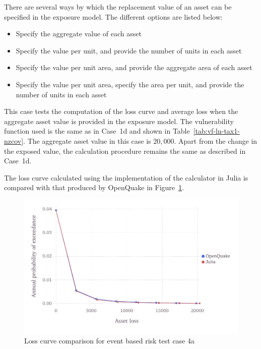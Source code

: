 There are several ways by which the replacement value of an asset can be specified in the exposure model. The different options are listed below:

\begin{itemize}
	\item Specify the aggregate value of each asset
	\item Specify the value per unit, and provide the number of units in each asset
	\item Specify the value per unit area, and provide the aggregate area of each asset
	\item Specify the value per unit area, specify the area per unit, and provide the number of units in each asset
\end{itemize}

This case tests the computation of the loss curve and average loss when the aggregate asset value is provided in the exposure model. The vulnerability function used is the same as in Case~1d and shown in Table~\ref{tab:vf-ln-tax1-nzcov}. The aggregate asset value in this case is $20,000$. Apart from the change in the exposed value, the calculation procedure remains the same as described in Case~1d.

The loss curve calculated using the implementation of the calculator in Julia is compared with that produced by OpenQuake in Figure~\ref{fig:lc-ebr-4a}.

\begin{figure}[htbp]
\centering
\includegraphics[width=12cm]{qareport/figures/fig-lc-ebr-4a}
\caption{Loss curve comparison for event based risk test case 4a}
\label{fig:lc-ebr-4a}
\end{figure}